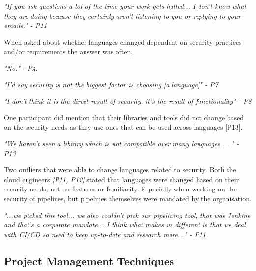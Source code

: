 \textit{"If you ask questions a lot of the time your work gets halted... I don't know what they are doing because they certainly aren't listening to you or replying to your emails." - P11}
\newline
\par
When asked about whether languages changed dependent on security practices and/or requirements the answer was often,
\newline
\par \textit{"No." - P4}.
\newline
\par 
\textit{"I'd say security is not the biggest factor is choosing [a language]" - P7 }
\newline
\par
\textit{"I don't think it is the direct result of security, it's the result of functionality" - P8}
\newline
\par One participant did mention that their libraries and tools did not change based on the security needs as they use ones that can be used across languages [P13].
\newline
\par
\textit{"We haven't seen a library which is not compatible over many languages ... " - P13}
\newline
\par Two outliers that were able to change languages related to security. Both the cloud engineers \textit{[P11, P12]} stated that languages were changed based on their security needs; not on features or familiarity. Especially when working on the security of pipelines, but pipelines themselves were mandated by the organisation. 
\newline
\par
\textit{"...we picked this tool... we also couldn't pick our pipelining tool, that was Jenkins and that's a corporate mandate... I think what makes us different is that we deal with CI/CD so need to keep up-to-date and research more..." - P11}

\subsection{Project Management Techniques}

